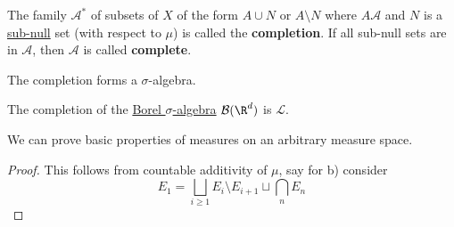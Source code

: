\documentclass{article}
\newcommand{\1}[1]{\mathbbm{1}_{#1}}
\begin{document}
\begin{defi}
    The family $\mathcal{A}^*$ of subsets of $X$ of the form $A \cup N$ or $A \setminus N$ where $A \mathcal{A}$ and $N$ is a \hyperlink{def:null}{sub-null} set (with respect to $\mu$) is called the \textbf{completion}. If all sub-null sets are in $\mathcal{A}$, then $\mathcal{A}$ is called \textbf{complete}.
\end{defi}

\begin{prop}
    The completion forms a $\sigma$-algebra.
\end{prop}

\begin{eg}
    The completion of the \hyperlink{def:borelAlg}{Borel $\sigma$-algebra} $\mathcal{B}(\R^d)$ is $\mathcal{L}$.
\end{eg}

We can prove basic properties of measures on an arbitrary measure space.


\begin{proof}
    This follows from countable additivity of $\mu$, say for b) consider
    \begin{equation*}
        E_1 = \bigsqcup_{i \geq 1} E_i \setminus E_{i+1} \sqcup \bigcap_n E_n
    \end{equation*}
\end{proof}
\end{document}
